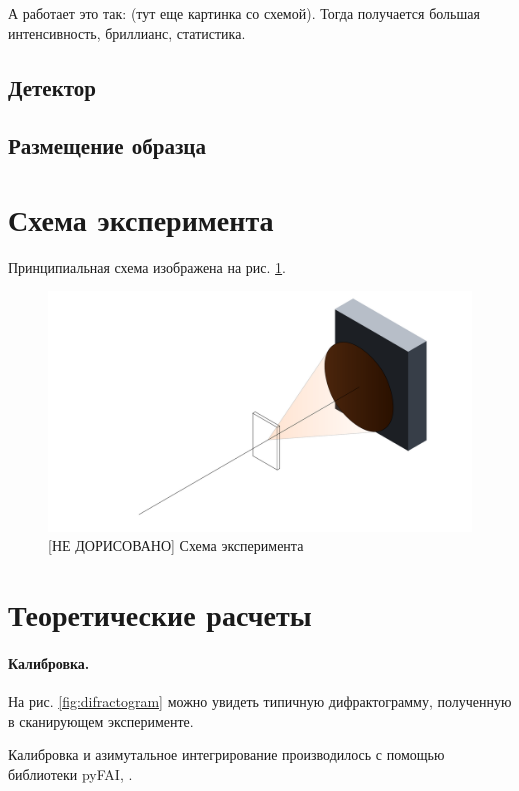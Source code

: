 А работает это так:
(тут еще картинка со схемой). Тогда получается большая интенсивность, бриллианс, статистика.

\subsection{Детектор}

\subsection{Размещение образца}


\section{Схема эксперимента}
Принципиальная схема изображена на рис. \ref{fig:experiment}. 


\begin{figure}[h]
    \centering
    \includegraphics[width=\linewidth]{fig/experiment.pdf}
    \caption{[НЕ ДОРИСОВАНО] Схема эксперимента}
    \label{fig:experiment}
\end{figure}

\section{Теоретические расчеты}

	\paragraph{Калибровка.}
На рис. \ref{fig:difractogram} можно увидеть типичную дифрактограмму, полученную в сканирующем эксперименте.  

Калибровка и азимутальное интегрирование производилось с помощью библиотеки pyFAI, \cite{pyfai}.

